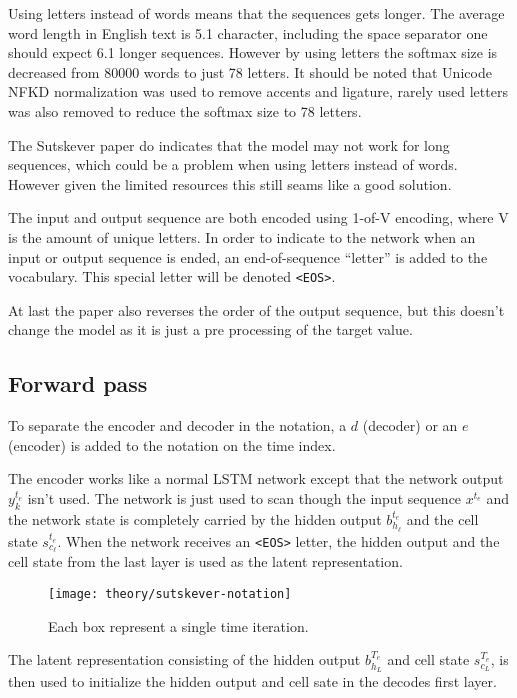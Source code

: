 Using letters instead of words means that the sequences gets longer. The average word length in English text is 5.1 character, including the space separator one should expect 6.1 longer sequences. However by using letters the softmax size is decreased from 80000 words to just 78 letters. It should be noted that Unicode NFKD normalization \cite{unicode-normalization} was used to remove accents and ligature, rarely used letters was also removed to reduce the softmax size to 78 letters.

The Sutskever paper \cite{sutskever} do indicates that the model may not work for long sequences, which could be a problem when using letters instead of words. However given the limited resources this still seams like a good solution.

The input and output sequence are both encoded using 1-of-V encoding, where V is the amount of unique letters. In order to indicate to the network when an input or output sequence is ended, an end-of-sequence ``letter'' is added to the vocabulary. This special letter will be denoted \texttt{<EOS>}.

At last the paper also reverses the order of the output sequence, but this doesn't change the model as it is just a pre processing of the target value.

\subsection{Forward pass}

To separate the encoder and decoder in the notation, a $d$ (decoder) or an $e$ (encoder) is added to the notation on the time index.

The encoder works like a normal LSTM network except that the network output $y_k^{t_e}$ isn't used. The network is just used to scan though the input sequence $x^{t_e}$ and the network state is completely carried by the hidden output $b_{h_\ell}^{t_e}$ and the cell state $s_{c_\ell}^{t_e}$. When the network receives an \texttt{<EOS>} letter, the hidden output and the cell state from the last layer is used as the latent representation.

\begin{figure}[H]
	\centering
	\texttt{[image: theory/sutskever-notation]}
	\caption{Each box represent a single time iteration.}
\end{figure}

The latent representation consisting of the hidden output $b_{h_{L}}^{T_e}$ and cell state $s_{c_{L}}^{T_e}$, is then used to initialize the hidden output and cell sate in the decodes first layer.

